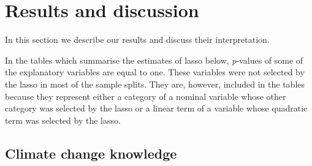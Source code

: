 \documentclass[a4paper,12pt]{article}
\begin{document}
\FloatBarrier
	\section{Results and discussion}\label{Results}
In this section we describe our results and discuss their interpretation.

In the tables which summarise the estimates of lasso below, \textit{p}-values of some of the explanatory variables are equal to one. These variables were not selected by the lasso in most of the sample splits. They are, however, included in the tables because they represent either a category of a nominal variable whose other category was selected by the lasso or a linear term of a variable whose quadratic term was selected by the lasso. 

\subsection{Climate change knowledge}\label{ResKnow}
\end{document}
